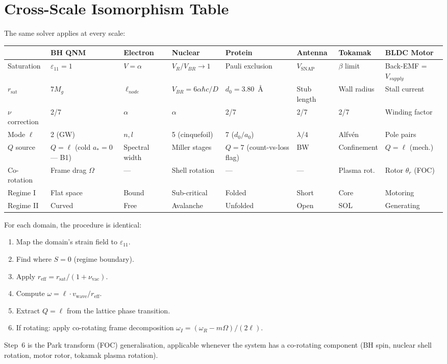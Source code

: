 \section{Cross-Scale Isomorphism Table}
\label{sec:solver_isomorphism}

The same solver applies at every scale:

\begin{center}
\renewcommand{\arraystretch}{1.3}
\scriptsize
\begin{tabularx}{\textwidth}{@{}lXXXXXXX@{}}
\toprule
& \textbf{BH QNM} & \textbf{Electron} & \textbf{Nuclear} & \textbf{Protein} & \textbf{Antenna} & \textbf{Tokamak} & \textbf{BLDC Motor} \\
\midrule
Saturation & $\varepsilon_{11} = 1$ & $V = \alpha$ & $V_R / V_{BR} \to 1$ & Pauli exclusion & $V_\mathrm{SNAP}$ & $\beta$ limit & Back-EMF = $V_{supply}$ \\
$r_\mathrm{sat}$ & $7M_g$ & $\ell_{node}$ & $V_{BR} = 6\alpha\hbar c/D$ & $d_0 = 3.80$~\AA & Stub length & Wall radius & Stall current \\
$\nu$ correction & 2/7 & $\alpha$ & $\alpha$ & 2/7 & 2/7 & 2/7 & Winding factor \\
Mode $\ell$ & 2 (GW) & $n,l$ & 5 (cinquefoil) & 7 ($d_0/a_0$) & $\lambda/4$ & Alfv\'en & Pole pairs \\
$Q$ source & $Q = \ell$ (cold $a_*=0$ --- B1) & Spectral width & Miller stages & $Q = 7$ (count-vs-loss flag) & BW & Confinement & $Q = \ell$ (mech.) \\
Co-rotation & Frame drag $\Omega$ & --- & Shell rotation & --- & --- & Plasma rot. & Rotor $\theta_r$ (FOC) \\
Regime I & Flat space & Bound & Sub-critical & Folded & Short & Core & Motoring \\
Regime II & Curved & Free & Avalanche & Unfolded & Open & SOL & Generating \\
\bottomrule
\end{tabularx}
\end{center}
\normalsize

\noindent For each domain, the procedure is identical:
\begin{enumerate}
    \item Map the domain's strain field to $\varepsilon_{11}$.
    \item Find where $S = 0$ (regime boundary).
    \item Apply $r_\mathrm{eff} = r_\mathrm{sat}/(1 + \nu_\mathrm{vac})$.
    \item Compute $\omega = \ell \cdot v_\mathrm{wave} / r_\mathrm{eff}$.
    \item Extract $Q = \ell$ from the lattice phase transition.
    \item If rotating: apply co-rotating frame decomposition $\omega_I = (\omega_R - m\Omega)/(2\ell)$.
\end{enumerate}
\noindent Step~6 is the Park transform (FOC) generalisation, applicable whenever the system has a co-rotating component (BH spin, nuclear shell rotation, motor rotor, tokamak plasma rotation).

